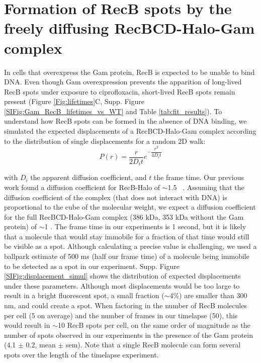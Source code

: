 \section{Formation of RecB spots by the freely diffusing RecBCD-Halo-Gam complex}
\label{note:spurious_spots}
In cells that overexpress the Gam protein, RecB is expected to be unable to bind DNA. Even though Gam overexpression prevents the apparition of long-lived RecB spots under exposure to ciprofloxacin, short-lived RecB spots remain present (Figure \ref{Fig:lifetimes}C, Supp. Figure \ref{SIFig:Gam_RecB_lifetimes_vs_WT} and Table \ref{tab:fit_results}). To understand how RecB spots can be formed in the absence of DNA binding, we simulated the expected displacements of a RecBCD-Halo-Gam complex according to the distribution of single displacements for a random 2D walk:
\begin{equation}
    P(r) = \dfrac{r}{2D_i t}e^{-\dfrac{r^2}{4D_i t}}
\end{equation}

with $D_i$ the apparent diffusion coefficient, and $t$ the frame time. Our previous work found a diffusion coefficient for RecB-Halo of $\sim$1.5 \ums\ \cite{Lepore2023}. Assuming that the diffusion coefficient of the complex (that does not interact with DNA) is proportional to the cube of the molecular weight, we expect a diffusion coefficient for the full RecBCD-Halo-Gam complex (386 kDa, 353 kDa without the Gam protein) of $\sim$1 \ums. The frame time in our experiments is 1 second, but it is likely that a molecule that would stay immobile for a fraction of that time would still be visible as a spot. Although calculating a precise value is challenging, we used a ballpark estimate of 500 ms (half our frame time) of a molecule being immobile to be detected as a spot in our experiment. Supp. Figure \ref{SIFig:displacement_simul} shows the distribution of expected displacements under these parameters. Although most displacements would be too large to result in a bright fluorescent spot, a small fraction ($\sim$4\%) are smaller than 300 nm, and could create a spot. When factoring in the number of RecB molecules per cell (5 on average\cite{Lepore2019a}) and the number of frames in our timelapse (50), this would result in $\sim$10 RecB spots per cell, on the same order of magnitude as the number of spots observed in our experiments in the presence of the Gam protein (4.1 $\pm$ 0.2, mean $\pm$ sem). Note that a single RecB molecule can form several spots over the length of the timelapse experiment.

